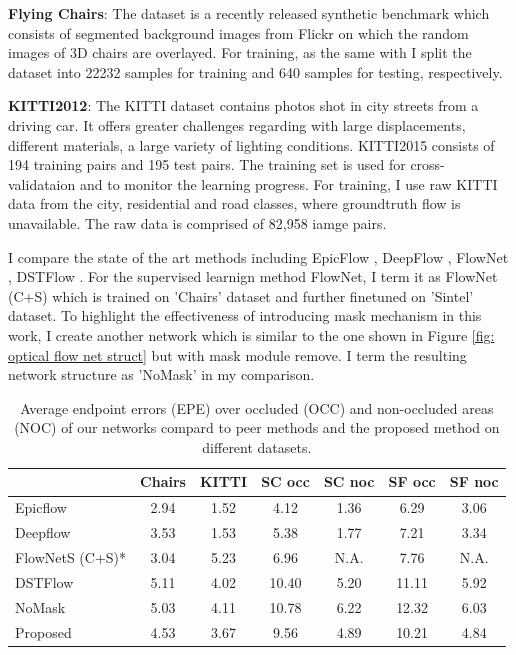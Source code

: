 \documentclass{iitthesis}
\begin{document}
\noindent \textbf{Flying Chairs}: The dataset \cite{DFIB15} is a recently released synthetic benchmark which consists of segmented background images from Flickr on which the random images of 3D chairs are overlayed. For training, as the same with \cite{DFIB15} I split the dataset into 22232 samples for training and 640 samples for testing, respectively.

\noindent \textbf{KITTI2012}: The KITTI dataset \cite{Geiger2012CVPR} contains photos shot in city streets from a driving car. It offers greater challenges regarding with large displacements, different materials, a large variety of lighting conditions. KITTI2015 consists of 194 training pairs and 195 test pairs. The training set is used for cross-validataion and to monitor the learning progress. For training, I use raw KITTI data from the city, residential and road classes, where groundtruth flow is unavailable. The raw data is comprised of 82,958 iamge pairs. 

I compare the state of the art methods including EpicFlow \cite{revaud2015epicflow}, DeepFlow \cite{weinzaepfel2013deepflow}, FlowNet \cite{reed2016generative}, DSTFlow \cite{ren2017unsupervised}. For the supervised learnign method FlowNet, I term it as FlowNet (C+S) which is trained on 'Chairs' dataset and further finetuned on 'Sintel' dataset. To highlight the effectiveness of introducing mask mechanism in this work, I create another network which is similar to the one shown in Figure \ref{fig: optical flow net struct} but with mask module remove. I term the resulting network structure as 'NoMask' in my comparison.

\begin{table}[]
\centering
\caption{Average endpoint errors (EPE) over occluded (OCC) and non-occluded areas (NOC) of our networks compard to peer methods and the proposed method on different datasets. }
\label{tab: optical flow comparison}
\begin{tabular}{lcccccc}
\hline
\hline
 & Chairs & KITTI & SC occ & SC noc & SF occ & SF noc \\ \hline
Epicflow & 2.94 & 1.52 & 4.12 & 1.36 & 6.29 & 3.06 \\
Deepflow & 3.53 & 1.53 & 5.38 & 1.77 & 7.21 & 3.34 \\
FlowNetS (C+S)* & 3.04 & 5.23 & 6.96 & N.A. & 7.76 & N.A. \\
DSTFlow & 5.11 & 4.02 & 10.40 & 5.20 & 11.11 & 5.92 \\
NoMask & 5.03 & 4.11 & 10.78 & 6.22 & 12.32 & 6.03 \\
Proposed & 4.53 & 3.67 & 9.56 & 4.89 & 10.21 & 4.84 \\ \hline
\end{tabular}
\end{table}
\end{document}
